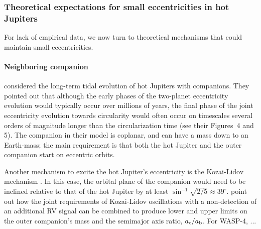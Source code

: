\documentclass[12pt,twocolumn,tighten]{aastex62}
\begin{document}
\subsubsection{Theoretical expectations for small eccentricities in hot
Jupiters}

For lack of empirical data, we now turn to theoretical mechanisms
that could maintain small eccentricities.

\paragraph{Neighboring companion}
\citet{mardling_long-term_2007} considered the long-term tidal
evolution of hot Jupiters with companions.  They pointed out that
although the early phases of the two-planet eccentricity evolution
would typically occur over millions of years, the final phase of the
joint eccentricity evolution towards circularity would often occur on
timescales several orders of magnitude longer than the circularization
time (see their Figures~4 and 5).  The companion in their model is
coplanar, and can have a mass down to an Earth-mass; the main
requirement is that both the hot Jupiter and the outer companion start
on eccentric orbits.

Another mechanism to excite the hot Jupiter's eccentricity is the
Kozai-Lidov mechanism \citep{lidov_evolution_1962,kozai_secular_1962}.
In this case, the orbital plane of the companion would need to be
inclined relative to that of the hot Jupiter by at least $\sin^{-1}
\sqrt{2/5} \approx 39^\circ$.
\citet{bailey_understanding_2019} point out how the joint requirements
of Kozai-Lidov oscillations with a non-detection of an additional RV
signal can be combined to produce lower and upper limits on the outer
companion's mass and the semimajor axis ratio, $a_{\rm c}/a_{\rm b}$.
For WASP-4, ...
\end{document}

